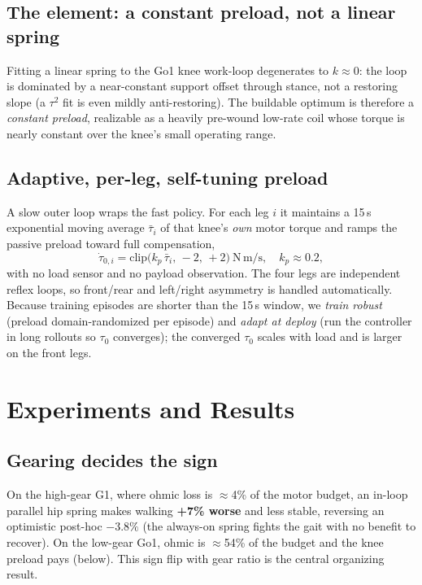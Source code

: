 \documentclass[journal]{IEEEtran}
\begin{document}
\subsection{The element: a constant preload, not a linear spring}
Fitting a linear spring to the Go1 knee work-loop degenerates to $k\approx 0$: the loop is dominated by a
near-constant support offset through stance, not a restoring slope (a $\tau^2$ fit is even mildly
anti-restoring). The buildable optimum is therefore a \emph{constant preload}, realizable as a heavily
pre-wound low-rate coil whose torque is nearly constant over the knee's small operating range.

\subsection{Adaptive, per-leg, self-tuning preload}
A slow outer loop wraps the fast policy. For each leg $i$ it maintains a 15\,s exponential moving average
$\bar\tau_i$ of that knee's \emph{own} motor torque and ramps the passive preload toward full compensation,
\begin{equation}
\dot\tau_{0,i} = \mathrm{clip}\!\big(k_p\,\bar\tau_i,\, -2,\, +2\big)\ \mathrm{N\,m/s},\quad k_p \approx 0.2,
\end{equation}
with no load sensor and no payload observation. The four legs are independent reflex loops, so front/rear and
left/right asymmetry is handled automatically. Because training episodes are shorter than the 15\,s window, we
\emph{train robust} (preload domain-randomized per episode) and \emph{adapt at deploy} (run the controller in
long rollouts so $\tau_0$ converges); the converged $\tau_0$ scales with load and is larger on the front legs.

\section{Experiments and Results}
\subsection{Gearing decides the sign}
On the high-gear G1, where ohmic loss is $\approx$4\% of the motor budget, an in-loop parallel hip spring makes
walking \textbf{+7\% worse} and less stable, reversing an optimistic post-hoc $-3.8\%$ (the always-on spring
fights the gait with no benefit to recover). On the low-gear Go1, ohmic is $\approx$54\% of the budget and the
knee preload pays (below). This sign flip with gear ratio is the central organizing result.
\end{document}
